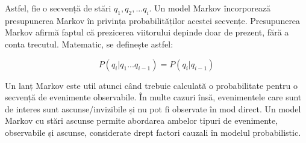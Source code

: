 \documentclass[a4paper,12pt]{report}
\begin{document}

Astfel, fie o secvență de stări  $q_1,q_2,...q_i$. Un model Markov încorporează presupunerea Markov
în privința probabilităților acestei secvențe. Presupunerea Markov afirmă faptul că prezicerea
viitorului depinde doar de prezent, fără a conta trecutul. Matematic, se definește astfel:
    
\begin{equation*}
    P(q_i|q_1...q_{i-1}) = P(q_i|q_{i-1})
\end{equation*}

Un lanț Markov este util atunci când trebuie calculată o probabilitate pentru o secvență de 
evenimente observabile. În multe cazuri însă, evenimentele care sunt de interes sunt ascunse/invizibile 
și nu pot fi observate în mod direct. Un model Markov cu stări ascunse permite abordarea 
ambelor tipuri de evenimente, observabile și ascunse, considerate drept factori cauzali 
în modelul probabilistic. 
\end{document}
